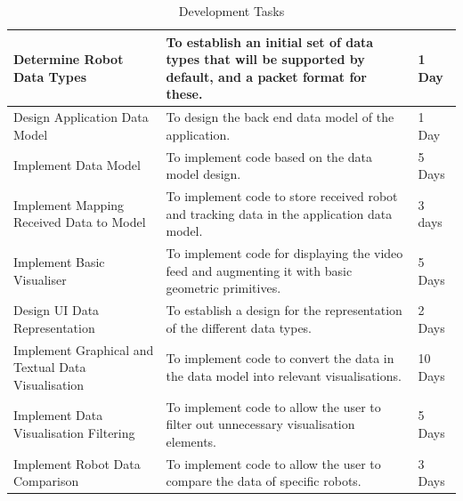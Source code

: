 \documentclass[titlepage,hidelinks,10pt]{article}
\begin{document}
\begin{table}[H]
\begin{tabular}[h]{ |>{\raggedright}p{5cm}|>{\raggedright}p{7cm}|p{3cm}| }
  Determine Robot Data Types 						& To establish an initial set of data types that will be supported by default, and a packet format for these. 			& 1 Day \\ \hline
  Design Application Data Model 					& To design the back end data model of the application. 																& 1 Day \\ \hline
  Implement Data Model 								& To implement code based on the data model design. 																	& 5 Days \\ \hline
  Implement Mapping Received Data to Model 			& To implement code to store received robot and tracking data in the application data model. 							& 3 days \\ \hline
  Implement Basic Visualiser 						& To implement code for displaying the video feed and augmenting it with basic geometric primitives. 					& 5 Days \\ \hline
  Design UI Data Representation 					& To establish a design for the representation of the different data types. 											& 2 Days \\ \hline
  Implement Graphical and Textual Data Visualisation & To implement code to convert the data in the data model into relevant visualisations. 								& 10 Days \\ \hline
  Implement Data Visualisation Filtering 			& To implement code to allow the user to filter out unnecessary visualisation elements. 								& 5 Days \\ \hline
  Implement Robot Data Comparison 					& To implement code to allow the user to compare the data of specific robots. 											& 3 Days \\ \hline
\end{tabular}
\caption{Development Tasks\label{DevTaskTable}}
\end{table}
\end{document}

